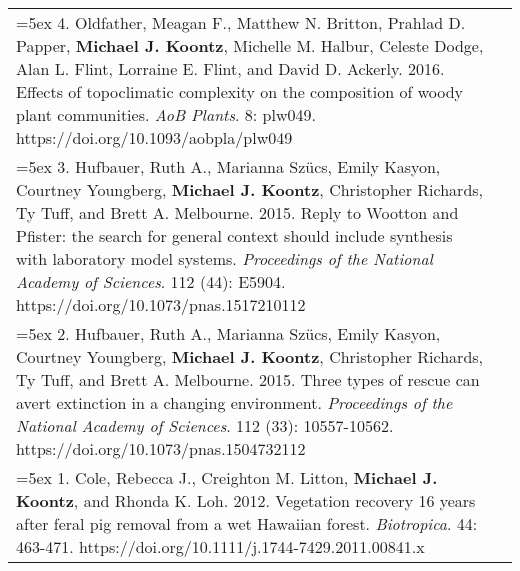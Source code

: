\begin{longtable}{@{} >{\raggedright}p{6.10in} >{\raggedleft}X @{}}
\hangindent=5ex 4. Oldfather, Meagan F., Matthew N. Britton, Prahlad D. Papper, \textbf{Michael J. Koontz}, Michelle M. Halbur, Celeste Dodge, Alan L. Flint, Lorraine E. Flint, and David D. Ackerly. 2016. Effects of topoclimatic complexity on the composition of woody plant communities. \emph{AoB Plants}. 8: plw049. https://doi.org/10.1093/aobpla/plw049 &  \tabularnewline

\hangindent=5ex 3. Hufbauer, Ruth A., Marianna Sz\"ucs, Emily Kasyon, Courtney Youngberg, \textbf{Michael J. Koontz}, Christopher Richards, Ty Tuff, and Brett A. Melbourne. 2015. Reply to Wootton and Pfister: the search for general context should include synthesis with laboratory model systems. \emph{Proceedings of the National Academy of Sciences}. 112 (44): E5904. https://doi.org/10.1073/pnas.1517210112 &  \tabularnewline

\hangindent=5ex 2. Hufbauer, Ruth A., Marianna Sz\"ucs, Emily Kasyon, Courtney Youngberg, \textbf{Michael J. Koontz}, Christopher Richards, Ty Tuff, and Brett A. Melbourne. 2015. Three types of rescue can avert extinction in a changing environment. \emph{Proceedings of the National Academy of Sciences}. 112 (33): 10557-10562. https://doi.org/10.1073/pnas.1504732112 &  \tabularnewline

\hangindent=5ex 1. Cole, Rebecca J., Creighton M. Litton, \textbf{Michael J. Koontz}, and Rhonda K. Loh. 2012. Vegetation recovery 16 years after feral pig removal from
a wet Hawaiian forest. \emph{Biotropica}. 44: 463-471. https://doi.org/10.1111/j.1744-7429.2011.00841.x &  \tabularnewline

\end{longtable}